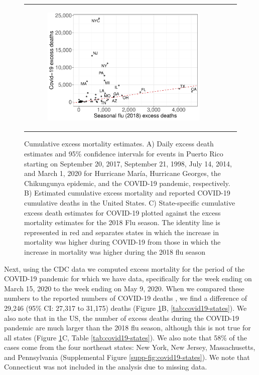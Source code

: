 \documentclass[11pt]{article}
\begin{document}
\begin{figure}[ht]
\begin{tabular}{lll}
\begin{subfigure}[t]{0.3\linewidth}
		\includegraphics[width=1\linewidth]{figs/figure-2c.pdf}
	\end{subfigure}\\
	\end{tabular}
    \caption{Cumulative excess mortality estimates. A) Daily excess death estimates and 95\% confidence intervals for events in Puerto Rico starting on September 20, 2017, September 21, 1998, July 14, 2014, and March 1, 2020 for Hurricane Mar\'ia, Hurricane Georges, the Chikungunya epidemic, and the COVID-19 pandemic, respectively.  B) Estimated cumulative excess mortality and reported COVID-19 cumulative deaths in the United States. C) State-specific cumulative excess death estimates for COVID-19 plotted against the excess mortality estimates for the 2018 Flu season. The identity line is represented in red and separates states in which the increase in mortality was higher during COVID-19 from those in which the increase in mortality was higher during the 2018 flu season}
    \label{fig:excess-deaths}
\end{figure}

Next, using the CDC data we computed excess mortality for the period of the COVID-19 pandemic for which we have data, specifically for the week ending on March 15, 2020 to the week ending on May 9, 2020. When we compared these numbers to the reported numbers of COVID-19 deaths \cite{smith2020coronavirus}, we find a difference of 29,246 (95\% CI: 27,317 to 31,175) deaths (Figure \ref{fig:excess-deaths}B, \ref{tab:covid19-states}). We also note that in the US, the number of excess deaths during the COVID-19 pandemic are much larger than the 2018 flu season, although this is not true for all states (Figure \ref{fig:excess-deaths}C, Table \ref{tab:covid19-states}). We also note that 58\% of the cases come from the four northeast states: New York, New Jersey, Massachusetts, and Pennsylvania (Supplemental Figure \ref{supp-fig:covid19-states}). We note that Connecticut was not included in the analysis due to missing data.
\end{document}
